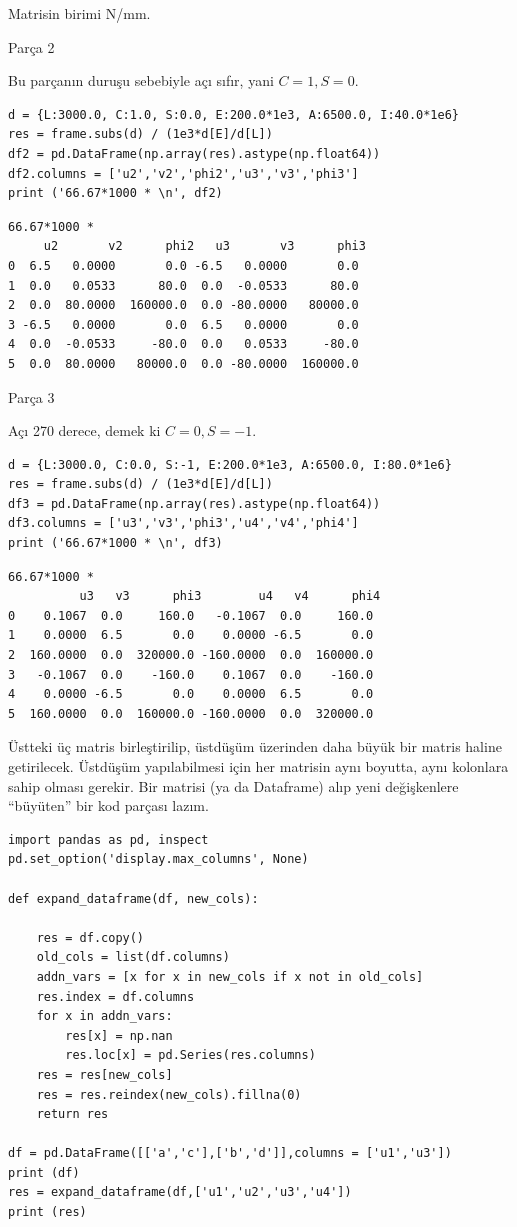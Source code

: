 \documentclass[12pt,fleqn]{article}\usepackage{../../common}
\begin{document}
Matrisin birimi N/mm. 

Parça 2

Bu parçanın duruşu sebebiyle açı sıfır, yani $C=1,S=0$.

\begin{verbatim}
d = {L:3000.0, C:1.0, S:0.0, E:200.0*1e3, A:6500.0, I:40.0*1e6}
res = frame.subs(d) / (1e3*d[E]/d[L])
df2 = pd.DataFrame(np.array(res).astype(np.float64))
df2.columns = ['u2','v2','phi2','u3','v3','phi3']
print ('66.67*1000 * \n', df2)
\end{verbatim}

\begin{verbatim}
66.67*1000 * 
     u2       v2      phi2   u3       v3      phi3
0  6.5   0.0000       0.0 -6.5   0.0000       0.0
1  0.0   0.0533      80.0  0.0  -0.0533      80.0
2  0.0  80.0000  160000.0  0.0 -80.0000   80000.0
3 -6.5   0.0000       0.0  6.5   0.0000       0.0
4  0.0  -0.0533     -80.0  0.0   0.0533     -80.0
5  0.0  80.0000   80000.0  0.0 -80.0000  160000.0
\end{verbatim}

Parça 3

Açı 270 derece, demek ki $C=0,S=-1$.

\begin{verbatim}
d = {L:3000.0, C:0.0, S:-1, E:200.0*1e3, A:6500.0, I:80.0*1e6}
res = frame.subs(d) / (1e3*d[E]/d[L])
df3 = pd.DataFrame(np.array(res).astype(np.float64))
df3.columns = ['u3','v3','phi3','u4','v4','phi4']
print ('66.67*1000 * \n', df3)
\end{verbatim}

\begin{verbatim}
66.67*1000 * 
          u3   v3      phi3        u4   v4      phi4
0    0.1067  0.0     160.0   -0.1067  0.0     160.0
1    0.0000  6.5       0.0    0.0000 -6.5       0.0
2  160.0000  0.0  320000.0 -160.0000  0.0  160000.0
3   -0.1067  0.0    -160.0    0.1067  0.0    -160.0
4    0.0000 -6.5       0.0    0.0000  6.5       0.0
5  160.0000  0.0  160000.0 -160.0000  0.0  320000.0
\end{verbatim}

Üstteki üç matris birleştirilip, üstdüşüm üzerinden daha büyük bir matris haline
getirilecek. Üstdüşüm yapılabilmesi için her matrisin aynı boyutta, aynı
kolonlara sahip olması gerekir. Bir matrisi (ya da Dataframe) alıp yeni
değişkenlere ``büyüten'' bir kod parçası lazım.

\begin{verbatim}
import pandas as pd, inspect
pd.set_option('display.max_columns', None)

def expand_dataframe(df, new_cols):

    res = df.copy()
    old_cols = list(df.columns)
    addn_vars = [x for x in new_cols if x not in old_cols]
    res.index = df.columns
    for x in addn_vars:
        res[x] = np.nan
        res.loc[x] = pd.Series(res.columns)
    res = res[new_cols]
    res = res.reindex(new_cols).fillna(0)
    return res

df = pd.DataFrame([['a','c'],['b','d']],columns = ['u1','u3'])
print (df)
res = expand_dataframe(df,['u1','u2','u3','u4'])
print (res)
\end{verbatim}
\end{document}
